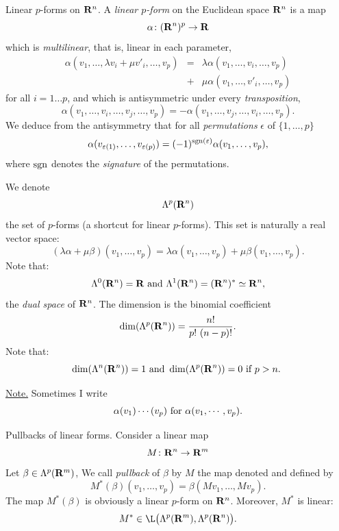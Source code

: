 \begin{Article}{Linear $p$-forms on $\mathbf{R}^n$.}{}
  A \emph{linear $p$-form} on the Euclidean space $\mathbf{R}^n$ is a map
  $$%
    \alpha \colon (\RR^n)^p \to \RR
  $$%
  which is \emph{multilinear},
  that is,
  linear in each parameter,
  \begin{eqnarray*}
    \alpha(v_1,\dots, \lambda v_i + \mu v'_i,\dots,v_p)  & = & \lambda \alpha(v_1,\dots,v_i,\dots,v_p)\\
    & + & \mu \alpha(v_1,\dots,v'_i,\dots,v_p)
  \end{eqnarray*}
  for all $i=1\dots p$,
  and which is antisymmetric under every \emph{transposition},
  $$%
    \alpha(v_1,\dots,v_i, \dots,v_j,\dots,v_p) = - \alpha(v_1,\dots,v_j, \dots,v_i,\dots,v_p).
  $$%
  We deduce from the antisymmetry that for all \emph{permutations} $\epsilon$ of $\{1,\dots,p\}$
  $$%
    \alpha(v_{\epsilon(1)},\dots,v_{\epsilon(p)}) = (-1)^{\Sign(\epsilon)} \alpha(v_1,\dots,v_p),
  $$%
  where $\operatorname{sgn}$ denotes the \emph{signature} of the permutations.

  We denote
  $$%
    \Lambda^p(\RR^n)
  $$%
  the set of $p$-forms (a shortcut for linear $p$-forms).
  This set is naturally a real vector space:
  $$%
    (\lambda \alpha + \mu \beta)(v_1,\dots,v_p) = \lambda \alpha(v_1,\dots,v_p) + \mu \beta(v_1,\dots,v_p).
  $$%
  Note that:
  $$%
    \Lambda^0(\RR^n) = \RR
    \SpacedText{and}
    \Lambda^1(\RR^n) = (\RR^n)^* \simeq \RR^n,
  $$%
  the \emph{dual space} of $\mathbf{R}^n$.
  The dimension is the binomial coefficient
  $$%
    \dim(\Lambda^p(\RR^n))  = {n! \over p! \ (n-p)!}.
  $$%
  Note that:
  $$%
    \dim(\Lambda^n(\RR^n)) = 1
    \SpacedText{and}
    \dim(\Lambda^p(\RR^n)) = 0
    \SpacedText{if $p>n$.}
  $$%

  \uline{Note.} Sometimes I write
  $$%
    \alpha(v_1)\cdots(v_p)
    \SpacedText{for}
    \alpha(v_1,\cdots,v_p).
  $$%
\end{Article}

\begin{Article}{Pullbacks of linear forms.}{}
  Consider a linear map
  $$%
    M \colon \RR^n \to \RR^m
  $$%
  Let $\beta \in \Lambda^p(\mathbf{R}^m)$,
  We call \emph{pullback} of $\beta$ by $M$ the map denoted and defined by
  $$%
    M^*(\beta) (v_1,\dots,v_p) = \beta(M v_1,\dots, M v_p).
  $$%
  The map $M^*(\beta)$ is obviously a linear $p$-form on $\mathbf{R}^n$.
  Moreover,
  $M^*$ is linear:
  $$%
    M^*  \in \L\big(\Lambda^p(\RR^m),\Lambda^p(\RR^n)\big).
  $$%
\end{Article}

